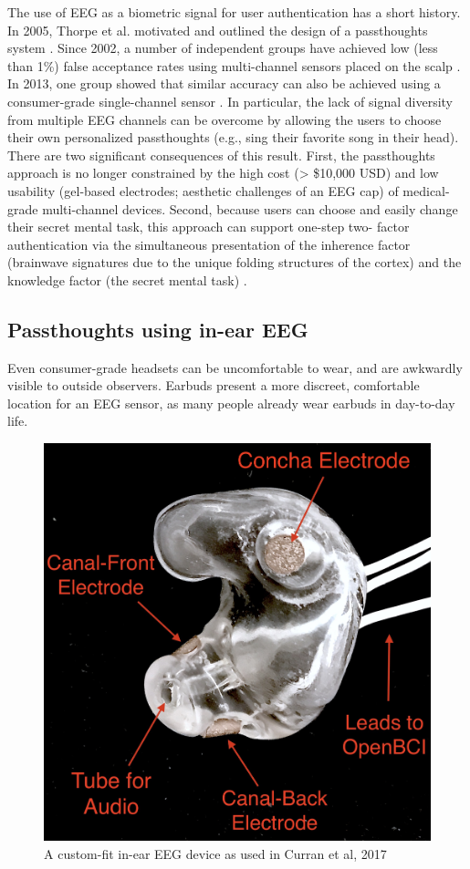 \documentclass[sigconf]{acmart}
\begin{document}
The use of EEG as a biometric signal for user authentication has a short history.
In 2005, Thorpe et al. motivated and outlined the design of a passthoughts system \cite{Thorpe2005}. Since 2002, a number of independent groups have achieved low (less than 1\%) false acceptance rates using multi-channel sensors placed on the scalp \cite{Poulos2002,Marcel2007a,Palaniappan2008,Ashby2011}.
In 2013, one group showed that similar accuracy can also be
achieved using a consumer-grade single-channel sensor \cite{Chuang2013b}. 
In particular, the lack of signal diversity from multiple EEG channels can be overcome by allowing
the users to choose their own personalized passthoughts (e.g., sing their favorite
song in their head). There are two significant consequences of this result. First,
the passthoughts approach is no longer constrained by the high cost (> \$10,000 USD)
and low usability (gel-based electrodes; aesthetic challenges of an EEG cap) of
medical-grade multi-channel devices. Second, because users can choose and
easily change their secret mental task, this approach can support one-step two-
factor authentication via the simultaneous presentation of the inherence factor
(brainwave signatures due to the unique folding structures of the cortex) and the
knowledge factor (the secret mental task) \cite{Chuang2014}.

\subsection{Passthoughts using in-ear EEG}
\label{sec:org7c65df9}

Even consumer-grade headsets can be uncomfortable to wear, and are awkwardly visible to outside observers. Earbuds present a more discreet, comfortable location for an EEG sensor, as many people already wear earbuds in day-to-day life.

\label{fig:earbud}
\begin{figure}[t!]
\centering
\includegraphics[width=.9\linewidth]{./figures/custom-fit-eeg-annotated.jpg}
\caption{A custom-fit in-ear EEG device as used in Curran et al, 2017}
\end{figure}
\end{document}

